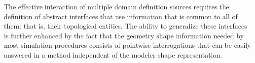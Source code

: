 The effective interaction of multiple domain definition sources
requires the definition of abstract interfaces that use information
that is common to all of them: that is, their topological entities.
The ability to generalize these interfaces is further
enhanced by the fact that the geometry shape information needed by
most simulation procedures consists of pointwise interrogations that
can be easily answered in a method independent of the modeler shape
representation.  


